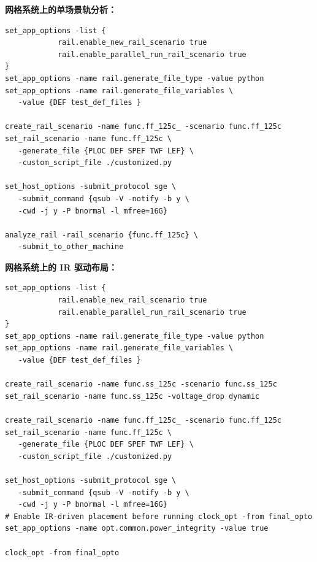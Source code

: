 \textbf{网格系统上的单场景轨分析：}
\begin{lstlisting}
set_app_options -list {
            rail.enable_new_rail_scenario true
            rail.enable_parallel_run_rail_scenario true
}
set_app_options -name rail.generate_file_type -value python
set_app_options -name rail.generate_file_variables \
   -value {DEF test_def_files }

create_rail_scenario -name func.ff_125c_ -scenario func.ff_125c
set_rail_scenario -name func.ff_125c \
   -generate_file {PLOC DEF SPEF TWF LEF} \
   -custom_script_file ./customized.py

set_host_options -submit_protocol sge \
   -submit_command {qsub -V -notify -b y \
   -cwd -j y -P bnormal -l mfree=16G}

analyze_rail -rail_scenario {func.ff_125c} \
   -submit_to_other_machine
\end{lstlisting}

\textbf{网格系统上的 IR 驱动布局：}
\begin{lstlisting}
set_app_options -list {
            rail.enable_new_rail_scenario true
            rail.enable_parallel_run_rail_scenario true
}
set_app_options -name rail.generate_file_type -value python
set_app_options -name rail.generate_file_variables \
   -value {DEF test_def_files }

create_rail_scenario -name func.ss_125c -scenario func.ss_125c
set_rail_scenario -name func.ss_125c -voltage_drop dynamic

create_rail_scenario -name func.ff_125c_ -scenario func.ff_125c
set_rail_scenario -name func.ff_125c \
   -generate_file {PLOC DEF SPEF TWF LEF} \
   -custom_script_file ./customized.py

set_host_options -submit_protocol sge \
   -submit_command {qsub -V -notify -b y \
   -cwd -j y -P bnormal -l mfree=16G}
# Enable IR-driven placement before running clock_opt -from final_opto
set_app_options -name opt.common.power_integrity -value true

clock_opt -from final_opto
\end{lstlisting}

